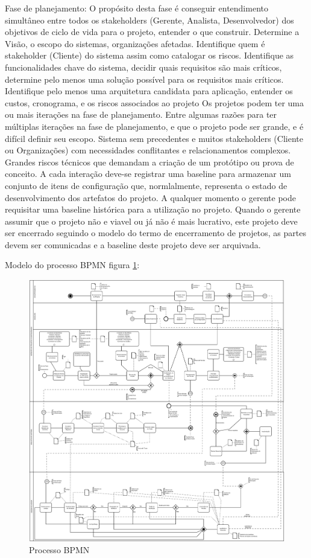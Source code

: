 \documentclass[	DIV=calc,%
							paper=a4,%
							fontsize=12pt,%
							onecolumn]{scrartcl}	 					%
\begin{document}
    Fase de planejamento: O propósito desta fase é conseguir entendimento simultâneo entre todos os stakeholders (Gerente, Analista, Desenvolvedor) dos objetivos de ciclo de vida para o projeto, entender o que construir. Determine a Visão, o escopo do sistemas, organizações afetadas. Identifique quem é stakeholder (Cliente) do sistema assim como catalogar os riscos. Identifique as funcionalidades chave do sistema, decidir quais requisitos são mais críticos, determine pelo menos uma solução possível para os requisitos mais críticos. Identifique pelo menos uma arquitetura candidata para aplicação, entender os custos, cronograma, e os riscos associados ao projeto
Os projetos podem ter uma ou mais iterações na fase de planejamento. Entre algumas razões para ter múltiplas iterações na fase de planejamento, e que o projeto pode ser grande, e é difícil definir seu escopo. Sistema sem precedentes e muitos stakeholders (Cliente ou Organizações) com necessidades conflitantes e relacionamentos complexos. Grandes riscos técnicos que demandam a criação de um protótipo ou prova de conceito. A cada interação deve-se registrar uma baseline para armazenar um conjunto de itens de configuração que, normlalmente, representa o estado de desenvolvimento dos artefatos do projeto. A qualquer momento o gerente pode requisitar uma baseline histórica para  a utilização no projeto.
Quando o gerente assumir que o projeto não e viavel ou já não é mais lucrativo, este projeto deve ser encerrado seguindo o modelo do termo de encerramento de projetos, as partes devem ser comunicadas e a baseline deste projeto deve ser arquivada. 

 Modelo do processo BPMN figura \ref{rup3}: 
 \begin{figure}[h!]
    \centering
	\includegraphics[scale=0.23]{diagramFinal.png}
	\caption{Processo BPMN}
	\label{rup3}
\end{figure}
\end{document}
